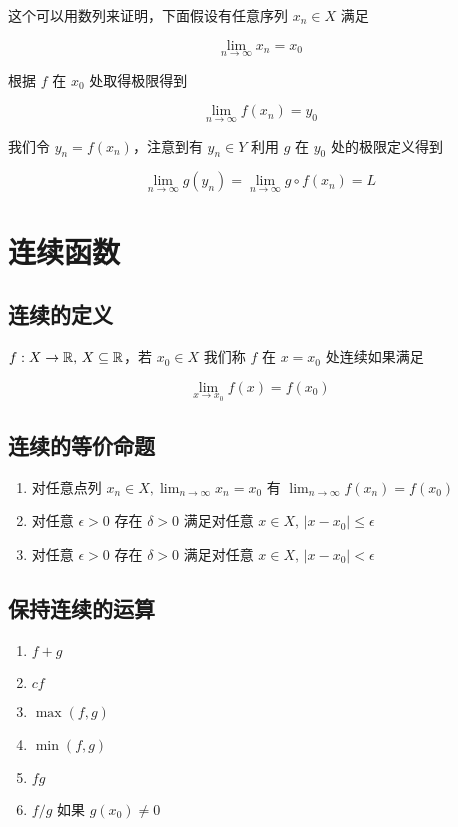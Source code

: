 这个可以用数列来证明，下面假设有任意序列 $x_n \in X$ 满足

\[
\lim_{n \to \infty} x_n = x_0
\]

根据 $f$ 在 $x_0$ 处取得极限得到

\[
\lim_{n \to \infty} f(x_n) = y_0
\]

我们令 $y_n = f(x_n)$，注意到有 $y_n \in Y$ 利用 $g$ 在 $y_0$ 处的极限定义得到


\[
\lim_{n \to \infty} g(y_n) = \lim_{n \to \infty} g \circ f(x_n) = L
\]

\section{连续函数}

\subsection{连续的定义}

$f: X \to \mathbb{R},\, X \subseteq \mathbb{R}$，若 $x_0 \in X$ 我们称 $f$ 在 $x = x_0$ 处连续如果满足

\[
\lim_{x \to x_0} f(x) = f(x_0)
\]

\subsection{连续的等价命题}

\begin{enumerate}
    \item 对任意点列 $x_n \in X, \lim_{n \to \infty} x_n = x_0$ 有 $\lim_{n \to \infty}f(x_n) = f(x_0)$
    \item 对任意 $\epsilon >0$ 存在 $\delta > 0$  满足对任意 $x \in X,\, \lvert x-x_0 \rvert \le \epsilon$
    \item 对任意 $\epsilon >0$ 存在 $\delta > 0$  满足对任意 $x \in X,\, \lvert x-x_0 \rvert < \epsilon$
\end{enumerate}


\subsection{保持连续的运算}

\begin{enumerate}
    \item $f+g$
    \item $cf$
    \item $\max(f,g)$
    \item $\min(f,g)$
    \item $fg$
    \item $f/g$ 如果 $g(x_0) \ne 0$
\end{enumerate}

